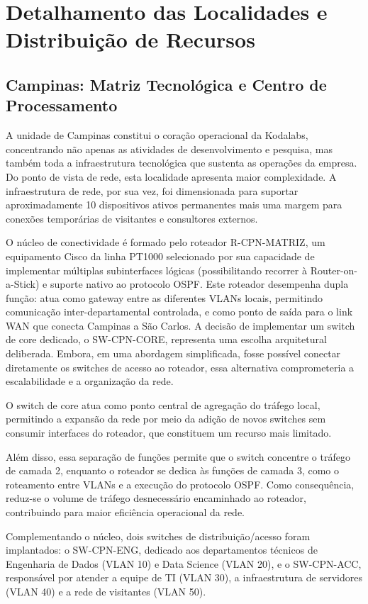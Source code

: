 \documentclass[12pt,a4paper]{article}
\begin{document}
\section{Detalhamento das Localidades e Distribuição de Recursos}

\subsection{Campinas: Matriz Tecnológica e Centro de Processamento}

A unidade de Campinas constitui o coração operacional da Kodalabs, concentrando não apenas as atividades de desenvolvimento e pesquisa, mas também toda a infraestrutura tecnológica que sustenta as operações da empresa. Do ponto de vista de rede, esta localidade apresenta maior complexidade. A infraestrutura de rede, por sua vez, foi dimensionada para suportar aproximadamente 10 dispositivos ativos permanentes mais uma margem para conexões temporárias de visitantes e consultores externos.

O núcleo de conectividade é formado pelo roteador R-CPN-MATRIZ, um equipamento Cisco da linha PT1000 selecionado por sua capacidade de implementar múltiplas subinterfaces lógicas (possibilitando recorrer à Router-on-a-Stick) e suporte nativo ao protocolo OSPF. Este roteador desempenha dupla função: atua como gateway entre as diferentes VLANs locais, permitindo comunicação inter-departamental controlada, e como ponto de saída para o link WAN que conecta Campinas a São Carlos. A decisão de implementar um switch de core dedicado, o SW-CPN-CORE, representa uma escolha arquitetural deliberada. Embora, em uma abordagem simplificada, fosse possível conectar diretamente os switches de acesso ao roteador, essa alternativa comprometeria a escalabilidade e a organização da rede.

O switch de core atua como ponto central de agregação do tráfego local, permitindo a expansão da rede por meio da adição de novos switches sem consumir interfaces do roteador, que constituem um recurso mais limitado.

Além disso, essa separação de funções permite que o switch concentre o tráfego de camada 2, enquanto o roteador se dedica às funções de camada 3, como o roteamento entre VLANs e a execução do protocolo OSPF. Como consequência, reduz-se o volume de tráfego desnecessário encaminhado ao roteador, contribuindo para maior eficiência operacional da rede.

Complementando o núcleo, dois switches de distribuição/acesso foram implantados: o SW-CPN-ENG, dedicado aos departamentos técnicos de Engenharia de Dados (VLAN 10) e Data Science (VLAN 20), e o SW-CPN-ACC, responsável por atender a equipe de TI (VLAN 30), a infraestrutura de servidores (VLAN 40) e a rede de visitantes (VLAN 50).
\end{document}
